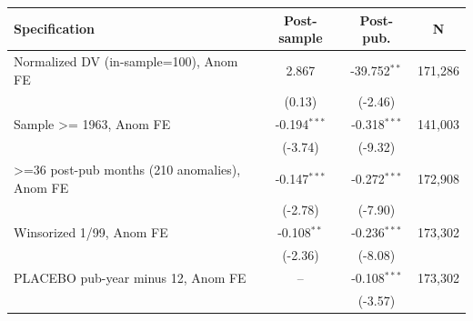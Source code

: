 \begin{tabular}{lccc}
\toprule
Specification & Post-sample & Post-pub. & N \\
\midrule
Normalized DV (in-sample=100), Anom FE & 2.867 & -39.752$^{**}$ & 171,286 \\
 & (0.13) & (-2.46) & \\
Sample >= 1963, Anom FE & -0.194$^{***}$ & -0.318$^{***}$ & 141,003 \\
 & (-3.74) & (-9.32) & \\
>=36 post-pub months (210 anomalies), Anom FE & -0.147$^{***}$ & -0.272$^{***}$ & 172,908 \\
 & (-2.78) & (-7.90) & \\
Winsorized 1/99, Anom FE & -0.108$^{**}$ & -0.236$^{***}$ & 173,302 \\
 & (-2.36) & (-8.08) & \\
PLACEBO pub-year minus 12, Anom FE & -- & -0.108$^{***}$ & 173,302 \\
 &  & (-3.57) & \\
\bottomrule
\end{tabular}